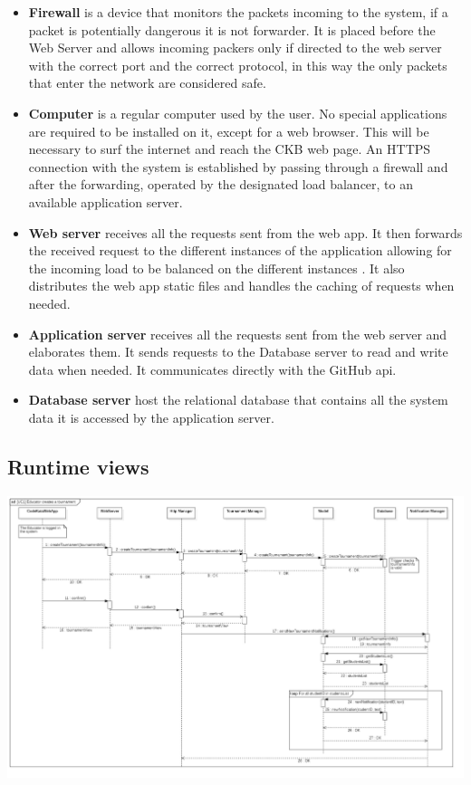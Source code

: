 \documentclass{article}
\begin{document}
\begin{itemize}
\item \textbf{Firewall} is a device that monitors the packets incoming to the system, if a packet is potentially dangerous it is not forwarder. It is placed before the Web Server and allows incoming packers only if directed to the web server with the correct port and the correct protocol, in this way the only packets that enter the network are considered safe.
\item \textbf{Computer} is a regular computer used by the user. No special applications are required to be installed on it, except for a web browser. This will be necessary to surf the internet and reach the CKB web page. An HTTPS connection with the system is established by passing through a firewall and after the forwarding, operated by the designated load balancer, to an available application server. 
\item \textbf{Web server} receives all the requests sent from the web app. It then forwards the received request to the different instances of the application allowing for the incoming load to be balanced on the different instances . It also distributes the web app static files and handles the caching of requests when needed.
\item \textbf{Application server} receives all the requests sent from the web server and elaborates them. It sends requests to the Database server to read and write data when needed. It communicates directly with the GitHub api.
\item \textbf{Database server} host the relational database that contains all the system data it is accessed by the application server.
\end{itemize}

\newpage
\subsection{Runtime views}
\begin{center}
    \includegraphics[angle=-90,width=0.73\linewidth]{uc1.jpg}
  \label{fig:uc1}
\end{center}
\end{document}
